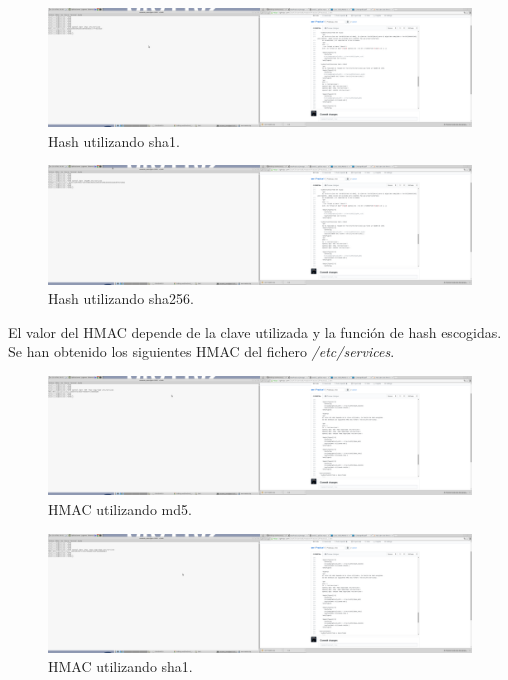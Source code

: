 \documentclass[11pt]{article}
\begin{document}
      \begin{figure}[!h]
        \centering
        \includegraphics[width = .9\textwidth]{hash_sha1}
        \caption{Hash utilizando sha1.}
      \end{figure}

      \begin{figure}[!h]
        \centering
        \includegraphics[width = .9\textwidth]{hash_sha256}
        \caption{Hash utilizando sha256.}
      \end{figure}

      \bigskip
      \par
      El valor del HMAC depende de la clave utilizada y la función de hash escogidas.
      Se han obtenido los siguientes HMAC del fichero \textit{/etc/services}.

      \begin{figure}[!h]
        \centering
        \includegraphics[width = .9\textwidth]{hmac_md5}
        \caption{HMAC utilizando md5.}
      \end{figure}

      \begin{figure}[!h]
        \centering
        \includegraphics[width = .9\textwidth]{hmac_sha1}
        \caption{HMAC utilizando sha1.}
      \end{figure}
\end{document}
